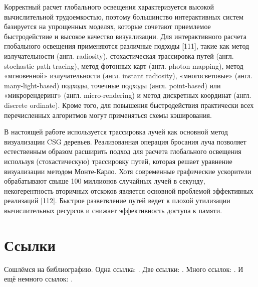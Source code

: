 {{{{Корректный расчет глобального освещения характеризуется высокой вычислительной трудоемкостью, поэтому большинство интерактивных систем базируется на упрощенных моделях, которые сочетают приемлемое быстродействие и высокое качество визуализации. Для интерактивного расчета глобального освещения применяются различные подходы [111], такие как метод излучательности (англ. radiosity), стохастическая трассировка путей (англ. stochastic path tracing), метод фотонных карт (англ. photon mapping), метод «мгновенной» излучательности (англ. instant radiosity), «многосветовые» (англ. many-light-based) подходы, точечные подходы (англ. point-based) или «микрорендеринг» (англ. micro-rendering) и метод дискретных координат (англ. discrete ordinate). Кроме того, для повышения быстродействия практически всех перечисленных алгоритмов могут применяться схемы кэширования.

В настоящей работе используется трассировка лучей как основной метод визуализации CSG деревьев. Реализованная операция бросания луча позволяет естественным образом расширить подход для расчета глобального освещения используя (стохастическую) трассировку путей, которая решает уравнение визуализации методом Монте-Карло. Хотя современные графические ускорители обрабатывают свыше 100 миллионов случайных лучей в секунду, некогерентность вторичных отскоков является основной проблемой эффективных реализаций [112]. Быстрое разветвление путей ведет к плохой утилизации вычислительных ресурсов и снижает эффективность доступа к памяти.



\section{Ссылки} \label{sect1_2}
Сошлёмся на библиографию.
Одна ссылка: \cite[с.~54]{Sokolov}\cite[с.~36]{Gaidaenko}.
Две ссылки: \cite{Sokolov,Gaidaenko}.
Много ссылок: %
\cite{Lermontov,Management,Borozda,Marketing,Constitution,FamilyCode,Gost.7.0.53,Razumovski,Lagkueva,Pokrovski,Sirotko,Lukina,Methodology,Encyclopedia,Nasirova,Berestova,Kriger}.
И ещё немного ссылок:
\cite{Article,Book,Booklet,Conference,Inbook,Incollection,Manual,Mastersthesis,Misc,Phdthesis,Proceedings,Techreport,Unpublished}.
\cite{medvedev2006jelektronnye, CEAT:CEAT581, doi:10.1080/01932691.2010.513279,Gosele1999161,Li2007StressAnalysis, Shoji199895,test:eisner-sample,AB_patent_Pomerantz_1968,iofis_patent1960}

}}}}
